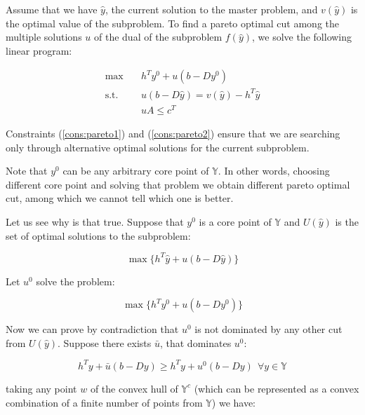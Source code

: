             Assume that we have $\hat{y}$, the current solution to the master problem, and $v(\hat{y})$ is the optimal value of the subproblem. To find a pareto optimal cut among the multiple solutions $u$ of the dual of the subproblem $f(\hat{y})$, we solve the following linear program:

            \begin{align}
                \max \quad & h^Ty^0 + u(b - Dy^0)\\
                \text{s.t.} \quad & u(b - D\hat{y}) = v(\hat{y}) - h^T\hat{y} \label{cons:pareto1}\\
                &uA \le c^T \label{cons:pareto2}
            \end{align}

            Constraints (\ref{cons:pareto1}) and (\ref{cons:pareto2}) ensure that we are searching only through alternative optimal solutions for the current subproblem. 

            Note that $y^0$ can be any arbitrary core point of $\mathbb{Y}$. In other words, choosing different core point and solving that problem we obtain different pareto optimal cut, among which we cannot tell which one is better.

            Let us see why is that true. Suppose that $y^0$ is a core point of $\mathbb{Y}$ and $U(\hat{y})$ is the set of optimal solutions to the subproblem:

            \begin{equation}
                \max\{h^T\hat{y} + u(b - D\hat{y})\} \label{cons:sub}
            \end{equation}

            Let $u^0$ solve the problem:

            \begin{equation}
                \max\{h^Ty^0 + u(b - Dy^0)\} \label{cons:sub0}
            \end{equation}  

            Now we can prove by contradiction that $u^0$ is not dominated by any other cut from $U(\hat{y})$. Suppose there exists $\bar{u}$, that dominates $u^0$:

            \begin{equation}
                h^Ty + \bar{u}(b - Dy) \ge h^Ty + u^0(b - Dy)\ \ \forall y \in \mathbb{Y} \label{cons:dom}
            \end{equation}

            taking any point $w$ of the convex hull of $\mathbb{Y}^c$ (which can be represented as a convex combination of a finite number of points from $\mathbb{Y}$) we have:

